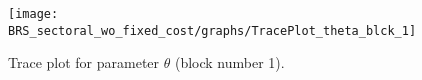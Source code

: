 \begin{figure}[H]
\centering
  \texttt{[image: BRS\_sectoral\_wo\_fixed\_cost/graphs/TracePlot\_theta\_blck\_1]}\\
    \caption{Trace plot for parameter ${\theta}$ (block number 1).}
\end{figure}
